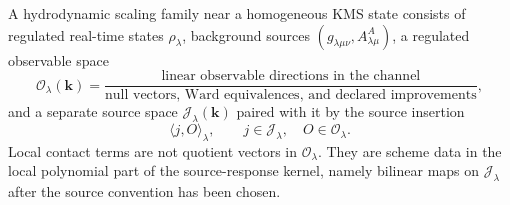 \begin{definition}
\label{def:hydro-scaling-family}
A hydrodynamic scaling family near a homogeneous KMS state consists of
regulated real-time states \(\rho_\lambda\), background sources
\((g_{\lambda\mu\nu},A^A_{\lambda\mu})\), a regulated observable space
\begin{equation}
  \mathcal O_\lambda(\mathbf k)
  =
  \frac{
    \text{linear observable directions in the channel}
  }{
    \text{null vectors, Ward equivalences, and declared improvements}
  },
  \label{eq:hydro-observable-quotient}
\end{equation}
and a separate source space \(\mathcal J_\lambda(\mathbf k)\) paired with it
by the source insertion
\[
  \langle j,O\rangle_\lambda,
  \qquad
  j\in\mathcal J_\lambda,\quad O\in\mathcal O_\lambda .
\]
Local contact terms are not quotient vectors in
\(\mathcal O_\lambda\).  They are scheme data in the local polynomial part of
the source-response kernel, namely bilinear maps on
\(\mathcal J_\lambda\) after the source convention has been chosen.


\end{definition}
